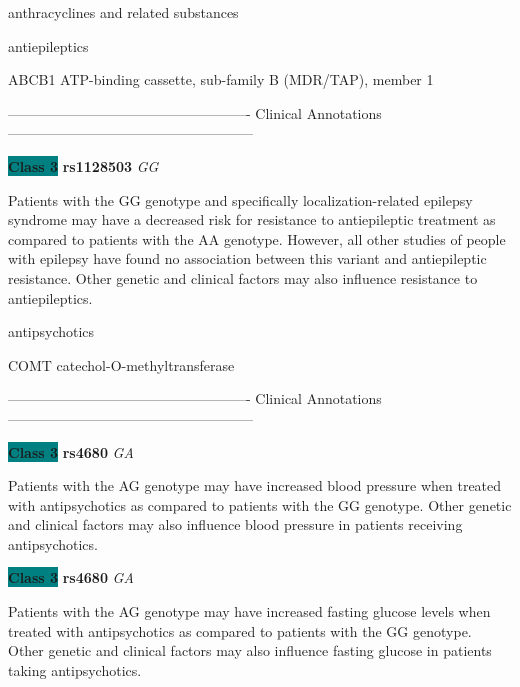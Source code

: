 \documentclass{resume} %
\begin{document}
\begin{rSection}{ anthracyclines and related substances }
\end{rSection}\begin{rSection}{ antiepileptics }
\item[]

\begin{rSubsection}{ ABCB1 }{ ATP-binding cassette, sub-family B (MDR/TAP), member 1 }{}{}
\item[]

\item[] ---------------------------------------------------- Clinical Annotations -----------------------------------------------------\newline
\item \textbf{\colorbox{teal} {Class 3}} \textbf{ rs1128503 } \textit{ GG }
\item[] Patients with the GG genotype and specifically localization-related epilepsy syndrome may have a decreased risk for resistance to antiepileptic treatment as compared to patients with the AA genotype. However, all other studies of people with epilepsy have found no association between this variant and antiepileptic resistance. Other genetic and clinical factors may also influence resistance to antiepileptics. 
\end{rSubsection}

\end{rSection}\begin{rSection}{ antipsychotics }
\item[]

\begin{rSubsection}{ COMT }{ catechol-O-methyltransferase }{}{}
\item[]

\item[] ---------------------------------------------------- Clinical Annotations -----------------------------------------------------\newline
\item \textbf{\colorbox{teal} {Class 3}} \textbf{ rs4680 } \textit{ GA }
\item[] Patients with the AG genotype may have increased blood pressure when treated with antipsychotics as compared to patients with the GG genotype. Other genetic and clinical factors may also influence blood pressure in patients receiving antipsychotics.\item \textbf{\colorbox{teal} {Class 3}} \textbf{ rs4680 } \textit{ GA }
\item[] Patients with the AG genotype may have increased fasting glucose levels when treated with antipsychotics as compared to patients with the GG genotype. Other genetic and clinical factors may also influence fasting glucose in patients taking antipsychotics.
\end{rSubsection}


\end{rSection}
\end{document}
